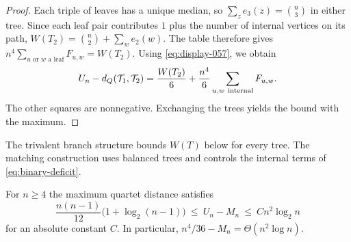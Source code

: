 \documentclass[12pt]{article}
\begin{document}
\begin{proof}
Each triple of leaves has a unique median, so $\sum_z e_3(z)=\binom n3$
in either tree. Since each leaf pair contributes $1$ plus the number
of internal vertices on its path, $W(T_2)=\binom n2+\sum_w e_2(w)$.
The table therefore gives
$n^4\sum_{u\text{ or }w\text{ a leaf}} F_{u,w}=W(T_2)$.
Using \eqref{eq:display-057}, we obtain
\begin{equation}\label{eq:binary-deficit}
 U_n-d_Q(\mathcal T_1,\mathcal T_2)=
 \frac{W(T_2)}6+\frac{n^4}6\sum_{u,w\ {\rm internal}}F_{u,w}.
\end{equation}
The other squares are nonnegative. Exchanging the trees yields the
bound with the maximum.
\end{proof}

The trivalent branch structure bounds $W(T)$ below for every tree.
The matching construction uses balanced trees and controls the
internal terms of \eqref{eq:binary-deficit}.

\begin{theorem}\label{thm:deficit-order}
For $n\ge4$ the maximum quartet distance satisfies
\[
 \frac{n(n-1)}{12}\bigl(1+\log_2(n-1)\bigr)
 \ \le\ U_n-M_n\ \le\ C n^2\log_2 n
\]
for an absolute constant $C$. In particular,
$n^4/36-M_n=\Theta(n^2\log n)$.
\end{theorem}
\end{document}
